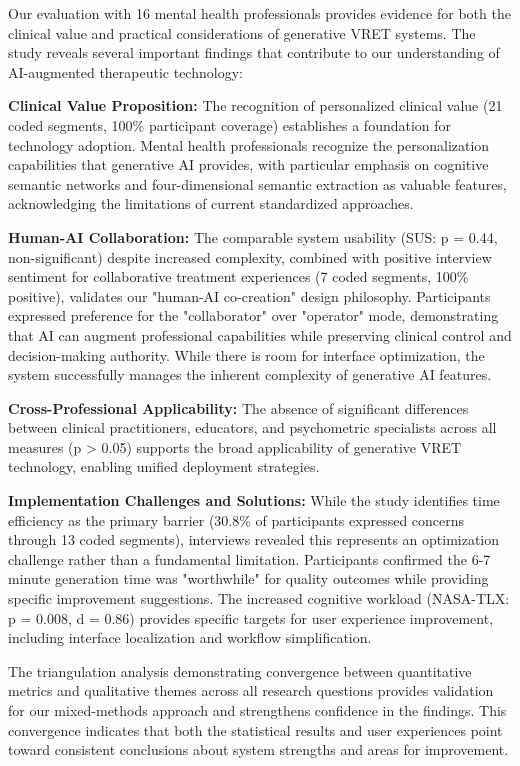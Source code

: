 \documentclass[]{interact}
\begin{document}
Our evaluation with 16 mental health professionals provides evidence for both the clinical value and practical considerations of generative VRET systems. The study reveals several important findings that contribute to our understanding of AI-augmented therapeutic technology:

\textbf{Clinical Value Proposition:} The recognition of personalized clinical value (21 coded segments, 100\% participant coverage) establishes a foundation for technology adoption. Mental health professionals recognize the personalization capabilities that generative AI provides, with particular emphasis on cognitive semantic networks and four-dimensional semantic extraction as valuable features, acknowledging the limitations of current standardized approaches.

\textbf{Human-AI Collaboration:} The comparable system usability (SUS: p = 0.44, non-significant) despite increased complexity, combined with positive interview sentiment for collaborative treatment experiences (7 coded segments, 100\% positive), validates our "human-AI co-creation" design philosophy. Participants expressed preference for the "collaborator" over "operator" mode, demonstrating that AI can augment professional capabilities while preserving clinical control and decision-making authority. While there is room for interface optimization, the system successfully manages the inherent complexity of generative AI features.

\textbf{Cross-Professional Applicability:} The absence of significant differences between clinical practitioners, educators, and psychometric specialists across all measures (p > 0.05) supports the broad applicability of generative VRET technology, enabling unified deployment strategies.

\textbf{Implementation Challenges and Solutions:} While the study identifies time efficiency as the primary barrier (30.8\% of participants expressed concerns through 13 coded segments), interviews revealed this represents an optimization challenge rather than a fundamental limitation. Participants confirmed the 6-7 minute generation time was "worthwhile" for quality outcomes while providing specific improvement suggestions. The increased cognitive workload (NASA-TLX: p = 0.008, d = 0.86) provides specific targets for user experience improvement, including interface localization and workflow simplification.

The triangulation analysis demonstrating convergence between quantitative metrics and qualitative themes across all research questions provides validation for our mixed-methods approach and strengthens confidence in the findings. This convergence indicates that both the statistical results and user experiences point toward consistent conclusions about system strengths and areas for improvement.
\end{document}

